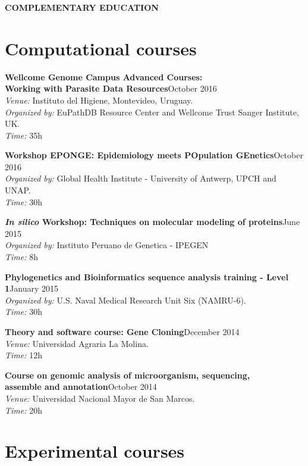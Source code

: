 \documentclass[margin,line]{res}
\begin{document}
\begin{resume}
{\scshape \textbf{COMPLEMENTARY EDUCATION}}

\section{\sc Computational courses}

{\bf Wellcome Genome Campus Advanced Courses:\\Working with Parasite Data Resources}\hfill {October 2016}\\
\textit{Venue:} Instituto del Higiene, Montevideo, Uruguay.\\
\textit{Organized by:} EuPathDB Resource Center and Wellcome Trust Sanger Institute, UK. \\ 
\textit{Time:} 35h

{\bf Workshop EPONGE: Epidemiology meets POpulation GEnetics}\hfill {October 2016}\\
\textit{Organized by:} Global Health Institute - University of Antwerp, UPCH and UNAP.\\
\textit{Time:} 30h

{\bf \textit{In silico} Workshop: Techniques on molecular modeling of proteins}\hfill {June 2015}\\
\textit{Organized by:} Instituto Peruano de Genetica - IPEGEN\\
\textit{Time:} 8h


{\bf Phylogenetics and Bioinformatics sequence analysis training - Level 1}\hfill {January 2015}\\
\textit{Organized by:} U.S. Naval Medical Research Unit Six (NAMRU-6).\\
\textit{Time:} 30h


{\bf Theory and software course: Gene Cloning}\hfill {December 2014}\\
\textit{Venue:} Universidad Agraria La Molina.\\
\textit{Time:} 12h


{\bf Course on genomic analysis of microorganism, sequencing, \\assemble and annotation}\hfill {October 2014}\\
\textit{Venue:} Universidad Nacional Mayor de San Marcos.\\
\textit{Time:} 20h




\section{\sc Experimental courses}


\end{resume}
\end{document}
